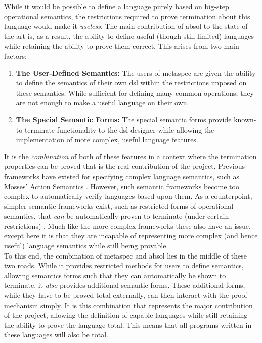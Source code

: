 While it would be possible to define a language purely based on big-step operational semantics, the restrictions required to prove termination about this language would make it \textit{useless}.
The main contribution of \gls{absol} to the state of the art is, as a result, the ability to define useful (though still limited) languages while retaining the ability to prove them correct.
This arises from two main factors:
\begin{enumerate}
    \item \textbf{The User-Defined Semantics:} The users of \gls{metaspec} are given the ability to define the semantics of their own \gls{dsl} within the restrictions imposed on these semantics.
    While sufficient for defining many common operations, they are not enough to make a useful language on their own.
    \item \textbf{The Special Semantic Forms:} The special semantic forms provide known-to-terminate functionality to the \gls{dsl} designer while allowing the implementation of more complex, useful language features.
\end{enumerate}

It is the \textit{combination} of both of these features in a context where the termination properties can be proved that is the real contribution of the project.
Previous frameworks have existed for specifying complex language semantics, such as Mosses' Action Semantics \citep{mosses1992action}. 
However, such semantic frameworks become too complex to automatically verify languages based upon them.
As a counterpoint, simpler semantic frameworks exist, such as restricted forms of operational semantics, that \textit{can} be automatically proven to terminate (under certain restrictions) \citep{Zhang:2004:SSD:981009.981013}.
Much like the more complex frameworks these also have an issue, except here it is that they are incapable of representing more complex (and hence useful) language semantics while still being provable.\\

To this end, the combination of \gls{metaspec} and \gls{absol} lies in the middle of these two roads.
While it provides restricted methods for users to define semantics, allowing semantics forms such that they can automatically be shown to terminate,
it \textit{also} provides additional semantic forms.
These additional forms, while they have to be proved total externally, can then interact with the proof mechanism simply. 
It is this combination that represents the major contribution of the project, allowing the definition of capable languages while still retaining the ability to prove the language total.
This means that all programs written in these languages will also be total.\\

